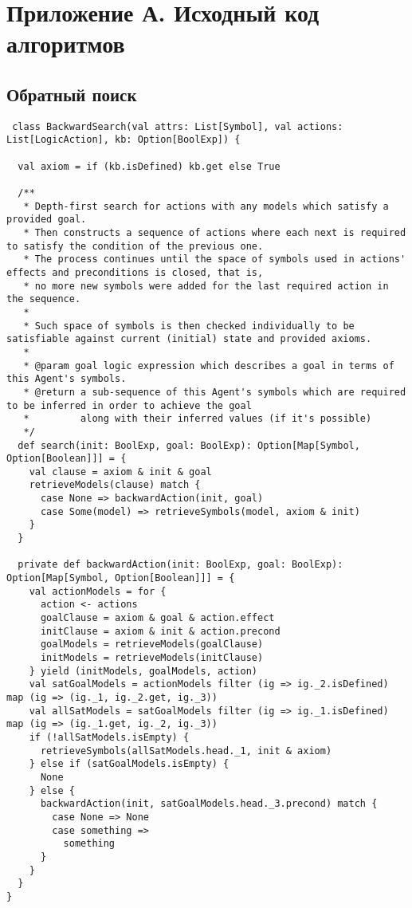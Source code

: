 \chapter*{Приложение А. Исходный код алгоритмов}

\section*{Обратный поиск}

\begin{lstlisting}
 class BackwardSearch(val attrs: List[Symbol], val actions: List[LogicAction], kb: Option[BoolExp]) {

  val axiom = if (kb.isDefined) kb.get else True

  /**
   * Depth-first search for actions with any models which satisfy a provided goal.
   * Then constructs a sequence of actions where each next is required to satisfy the condition of the previous one.
   * The process continues until the space of symbols used in actions' effects and preconditions is closed, that is,
   * no more new symbols were added for the last required action in the sequence.
   *
   * Such space of symbols is then checked individually to be satisfiable against current (initial) state and provided axioms.
   *
   * @param goal logic expression which describes a goal in terms of this Agent's symbols.
   * @return a sub-sequence of this Agent's symbols which are required to be inferred in order to achieve the goal
   *         along with their inferred values (if it's possible)
   */
  def search(init: BoolExp, goal: BoolExp): Option[Map[Symbol, Option[Boolean]]] = {
    val clause = axiom & init & goal
    retrieveModels(clause) match {
      case None => backwardAction(init, goal)
      case Some(model) => retrieveSymbols(model, axiom & init)
    }
  }

  private def backwardAction(init: BoolExp, goal: BoolExp): Option[Map[Symbol, Option[Boolean]]] = {
    val actionModels = for {
      action <- actions
      goalClause = axiom & goal & action.effect
      initClause = axiom & init & action.precond
      goalModels = retrieveModels(goalClause)
      initModels = retrieveModels(initClause)
    } yield (initModels, goalModels, action)
    val satGoalModels = actionModels filter (ig => ig._2.isDefined) map (ig => (ig._1, ig._2.get, ig._3))
    val allSatModels = satGoalModels filter (ig => ig._1.isDefined) map (ig => (ig._1.get, ig._2, ig._3))
    if (!allSatModels.isEmpty) {
      retrieveSymbols(allSatModels.head._1, init & axiom)
    } else if (satGoalModels.isEmpty) {
      None
    } else {
      backwardAction(init, satGoalModels.head._3.precond) match {
        case None => None
        case something =>
          something
      }
    }
  }
}
\end{lstlisting}

